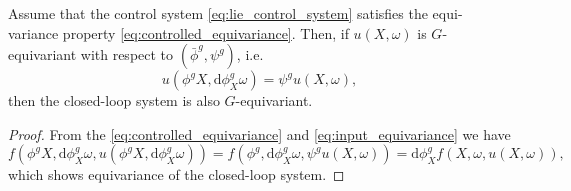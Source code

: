 \begin{proposition}
  Assume that the control system \eqref{eq:lie_control_system} satisfies the equi-variance property \eqref{eq:controlled_equivariance}. Then, if
  $u(X, \omega)$ is $G$-equivariant with respect to $(\bar \phi^g, \psi^g)$, i.e. 
  \begin{equation}
    \label{eq:input_equivariance}
    u(\phi^g X, \mathrm{d} \phi^g_X \omega) = \psi^g u(X, \omega),
  \end{equation}
  then the closed-loop system is also $G$-equivariant.
\end{proposition}
\begin{proof}
  From the \eqref{eq:controlled_equivariance} and \eqref{eq:input_equivariance} we have
  \begin{equation}
    f(\phi^g X, \mathrm{d} \phi^g_X \omega, u(\phi^g X, \mathrm{d} \phi^g_X \omega)) = f(\phi^g, \mathrm{d} \phi^g_X \omega, \psi^g u(X, \omega)) = \mathrm{d} \phi_X^g f(X, \omega, u(X, \omega)),
  \end{equation}
  which shows equivariance of the closed-loop system.
\end{proof}

